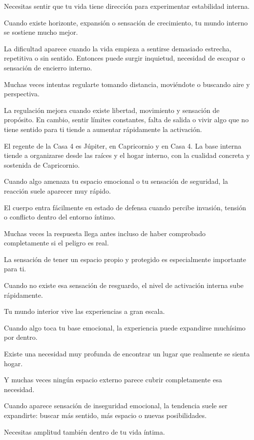 \documentclass[11pt,a4paper]{article}
\begin{document}
Necesitas sentir que tu vida tiene dirección para experimentar estabilidad interna.

Cuando existe horizonte, expansión o sensación de crecimiento, tu mundo interno se sostiene mucho mejor.

La dificultad aparece cuando la vida empieza a sentirse demasiado estrecha, repetitiva o sin sentido. Entonces puede surgir inquietud, necesidad de escapar o sensación de encierro interno.

Muchas veces intentas regularte tomando distancia, moviéndote o buscando aire y perspectiva.

La regulación mejora cuando existe libertad, movimiento y sensación de propósito. En cambio, sentir límites constantes, falta de salida o vivir algo que no tiene sentido para ti tiende a aumentar rápidamente la activación.

El regente de la Casa 4 es Júpiter, en Capricornio y en Casa 4. La base interna tiende a organizarse desde las raíces y el hogar interno, con la cualidad concreta y sostenida de Capricornio.

Cuando algo amenaza tu espacio emocional o tu sensación de seguridad, la reacción suele aparecer muy rápido.

El cuerpo entra fácilmente en estado de defensa cuando percibe invasión, tensión o conflicto dentro del entorno íntimo.

Muchas veces la respuesta llega antes incluso de haber comprobado completamente si el peligro es real.

La sensación de tener un espacio propio y protegido es especialmente importante para ti.

Cuando no existe esa sensación de resguardo, el nivel de activación interna sube rápidamente.

Tu mundo interior vive las experiencias a gran escala.

Cuando algo toca tu base emocional, la experiencia puede expandirse muchísimo por dentro.

Existe una necesidad muy profunda de encontrar un lugar que realmente se sienta hogar.

Y muchas veces ningún espacio externo parece cubrir completamente esa necesidad.

Cuando aparece sensación de inseguridad emocional, la tendencia suele ser expandirte: buscar más sentido, más espacio o nuevas posibilidades.

Necesitas amplitud también dentro de tu vida íntima.
\end{document}

